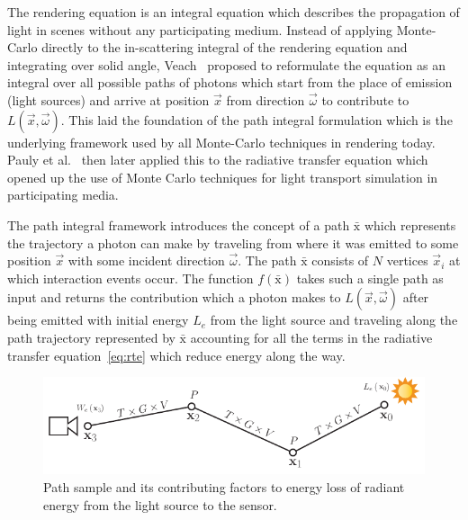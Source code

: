 The rendering equation is an integral equation which describes the propagation of light in scenes without any participating medium. Instead of applying Monte-Carlo directly to the in-scattering integral of the rendering equation and integrating over solid angle, Veach~\cite{VeachThesis97} proposed to reformulate the equation as an integral over all possible paths of photons which start from the place of emission (light sources) and arrive at position $\vec{x}$ from direction $\vec{\omega}$ to contribute to $L(\vec{x}, \vec{\omega})$. This laid the foundation of the path integral formulation which is the underlying framework used by all Monte-Carlo techniques in rendering today. Pauly et al.~\cite{Pauly00} then later applied this to the radiative transfer equation which opened up the use of Monte Carlo techniques for light transport simulation in participating media.


The path integral framework introduces the concept of a path $\bar{\mathrm{x}}$ which represents the trajectory a photon can make by traveling from where it was emitted to some position $\vec{x}$ with some incident direction $\vec{\omega}$. The path $\bar{\mathrm{x}}$ consists of $N$ vertices $\vec{x}_i$ at which interaction events occur. The function $f\left(\bar{\mathrm{x}}\right)$ takes such a single path as input and returns the contribution which a photon makes to $L(\vec{x}, \vec{\omega})$ after being emitted with initial energy $L_e$ from the light source and traveling along the path trajectory represented by $\bar{\mathrm{x}}$ accounting for all the terms in the radiative transfer equation~\ref{eq:rte} which reduce energy along the way.
\begin{figure}[t]
\centering
\includegraphics[width=1.0\textwidth]{03_foundations_of_light_transport_simulation/figures/fig_path_sample.pdf}
\caption{Path sample and its contributing factors to energy loss of radiant energy from the light source to the sensor.}
\label{fig:mc_path_sample_contributions}
\end{figure}

